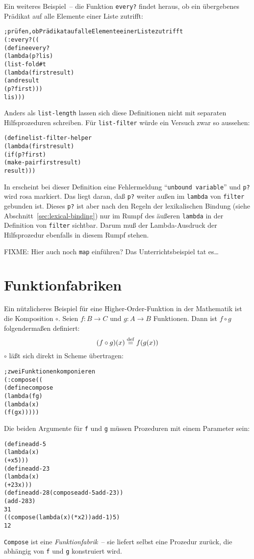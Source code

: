 %
Ein weiteres Beispiel~-- die Funktion
\texttt{every?} findet heraus, ob ein
übergebenes Prädikat auf alle Elemente einer Liste zutrifft:
\label{page:every}
%
\begin{alltt}
; prüfen, ob Prädikat auf alle Elemente einer Liste zutrifft
(: every? ((%a -> boolean) (list-of %a) -> boolean))
(define every?
  (lambda (p? lis)
    (list-fold #t
               (lambda (first result)
                 (and result
                      (p? first)))
               lis)))
\end{alltt}
%
Anders als \texttt{list-length} lassen sich diese Definitionen
nicht mit separaten Hilfsprozeduren schreiben.  Für
\texttt{list-filter} würde ein Versuch zwar so aussehen:
%
\begin{alltt}
(define list-filter-helper
  (lambda (first result)
    (if (p? first)
        (make-pair first result)
        result)))
\end{alltt}
%
In \drscheme{} erscheint bei dieser Definition eine Fehlermeldung 
"`\texttt{unbound variable}"' und \texttt{p?} wird rosa markiert.  Das
liegt daran, daß \texttt{p?} weiter außen im \texttt{lambda} von
\texttt{filter} gebunden ist.  Dieses \texttt{p?} ist aber nach den
Regeln der lexikalischen Bindung (siehe
Abschnitt~\ref{sec:lexical-binding}) nur im Rumpf des äußeren
\texttt{lambda} in der Definition von \texttt{filter} sichtbar.  Darum
muß der Lambda-Ausdruck der Hilfsprozedur ebenfalls in diesem
Rumpf stehen.

FIXME: Hier auch noch \texttt{map} einführen? Das Unterrichtsbeispiel tat
es\ldots

\section{Funktionfabriken}

Ein nützlicheres Beispiel für eine Higher-Order-Funktion in der
Mathematik ist die
Komposition
$\circ$.  Seien $f: B\rightarrow C$ und $g: A\rightarrow B$
Funktionen.  Dann ist $f\circ g$ folgendermaßen definiert:
%
\begin{displaymath}
  (f \circ g)(x) \stackrel{\rm def}{=}{} f(g(x))
\end{displaymath}
%
$\circ$ läßt sich direkt in Scheme
übertragen:
\label{page:compose}
%
\begin{alltt}
; zwei Funktionen komponieren
(: compose ((%b -> %c) (%a -> %b) -> (%a -> %c)))
(define compose
  (lambda (f g)
    (lambda (x)
      (f (g x)))))
\end{alltt}
%
Die beiden Argumente für \texttt{f} und \texttt{g} müssen Prozeduren
mit einem Parameter sein:
%
\begin{alltt}
(define add-5
  (lambda (x)
    (+ x 5)))
(define add-23
  (lambda (x)
    (+ 23 x)))
(define add-28 (compose add-5 add-23))
(add-28 3)
\evalsto{} 31
((compose (lambda (x) (* x 2)) add-1) 5)
\evalsto{} 12
\end{alltt}
%
\texttt{Compose} ist eine
\textit{Funktionfabrik}~-- sie liefert selbst
eine Prozedur zurück, die abhängig von \texttt{f} und \texttt{g}
konstruiert wird.

